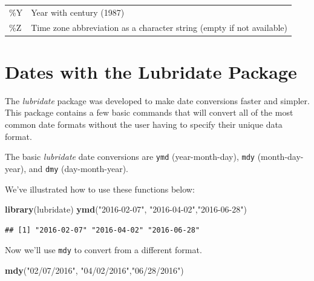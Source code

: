 \documentclass[]{book}
\newenvironment{Shaded}{\begin{snugshade}}{\end{snugshade}}
\newcommand{\KeywordTok}[1]{\textcolor[rgb]{0.13,0.29,0.53}{\textbf{{#1}}}}
\newcommand{\StringTok}[1]{\textcolor[rgb]{0.31,0.60,0.02}{{#1}}}
\newcommand{\NormalTok}[1]{{#1}}
\begin{document}
\begin{longtable}[]{@{}ll@{}}
\begin{minipage}[t]{0.34\columnwidth}\raggedright\strut
\%Y\strut
\end{minipage} & \begin{minipage}[t]{0.48\columnwidth}\raggedright\strut
Year with century (1987)\strut
\end{minipage}\tabularnewline
\begin{minipage}[t]{0.34\columnwidth}\raggedright\strut
\%Z\strut
\end{minipage} & \begin{minipage}[t]{0.48\columnwidth}\raggedright\strut
Time zone abbreviation as a character string (empty if not
available)\strut
\end{minipage}\tabularnewline
\bottomrule
\end{longtable}

\section{Dates with the Lubridate
Package}\label{dates-with-the-lubridate-package}

The \emph{lubridate} package was developed to make date conversions
faster and simpler. This package contains a few basic commands that will
convert all of the most common date formats without the user having to
specify their unique data format.

The basic \emph{lubridate} date conversions are \texttt{ymd}
(year-month-day), \texttt{mdy} (month-day-year), and \texttt{dmy}
(day-month-year).

We've illustrated how to use these functions below:

\begin{Shaded}
\begin{Highlighting}[]
\KeywordTok{library}\NormalTok{(lubridate)}
\KeywordTok{ymd}\NormalTok{(}\StringTok{"2016-02-07"}\NormalTok{, }\StringTok{"2016-04-02"}\NormalTok{,}\StringTok{"2016-06-28"}\NormalTok{)}
\end{Highlighting}
\end{Shaded}

\begin{verbatim}
## [1] "2016-02-07" "2016-04-02" "2016-06-28"
\end{verbatim}

Now we'll use \texttt{mdy} to convert from a different format.

\begin{Shaded}
\begin{Highlighting}[]
\KeywordTok{mdy}\NormalTok{(}\StringTok{"02/07/2016"}\NormalTok{, }\StringTok{"04/02/2016"}\NormalTok{,}\StringTok{"06/28/2016"}\NormalTok{)}
\end{Highlighting}
\end{Shaded}
\end{document}
